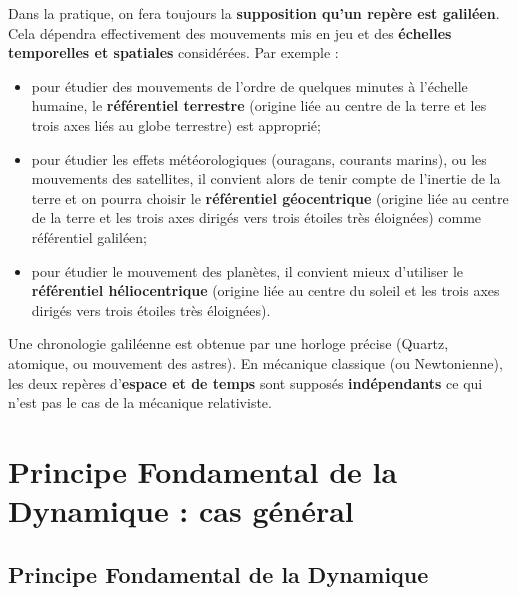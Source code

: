 \begin{rem}
Dans la pratique, on fera toujours la \textbf{supposition qu'un repère est galiléen}. Cela dépendra effectivement des mouvements mis en jeu et des \textbf{échelles temporelles et spatiales} considérées. 
Par exemple :
\begin{itemize}
\item pour étudier des mouvements de l'ordre de quelques minutes à l'échelle humaine, le \textbf{référentiel terrestre} (origine liée au centre de la terre et les trois axes liés au globe terrestre) est approprié;
\item pour étudier les effets météorologiques (ouragans, courants marins), ou les mouvements des satellites, il convient alors de tenir compte de l'inertie de la terre et on pourra choisir le \textbf{référentiel géocentrique} (origine liée au centre de la terre et les trois axes dirigés vers trois étoiles très éloignées) comme référentiel galiléen;
\item pour étudier le mouvement des planètes, il convient mieux d'utiliser le \textbf{référentiel héliocentrique} (origine liée au centre du soleil et les trois axes dirigés vers trois étoiles très éloignées).
\end{itemize}

Une chronologie galiléenne est obtenue par une horloge précise (Quartz, atomique, ou mouvement des astres).
En mécanique classique (ou Newtonienne), les deux repères d'\textbf{espace et de temps} sont supposés \textbf{indépendants} ce qui n'est pas le cas de la mécanique relativiste. 
\end{rem}



\section[PFD : cas général]{Principe Fondamental de la Dynamique : cas général}

\subsection{Principe Fondamental de la Dynamique}

